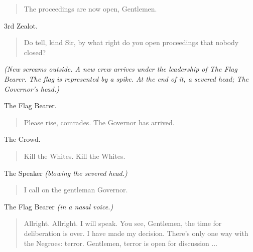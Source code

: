 \documentclass[letterpaper,article,12pt,oneside,notitlepage]{memoir}
\begin{document}
\begin{verse}
\hspace{1cm} The proceedings are now open, Gentlemen. \\
\end{verse}

\begin{center}3rd Zealot.\end{center}

\begin{verse}
\indent Do tell, kind Sir, by what right do you open proceedings that nobody closed? \\
\end{verse}

\textit{(New screams outside. A new crew arrives under the leadership of The Flag Bearer. The flag is represented by a spike. At the end of it, a severed head; The Governor's head.)}

\begin{center}The Flag Bearer.\end{center}

\begin{verse}
\hspace{1cm} Please rise, comrades. The Governor has arrived. \\
\end{verse}

\begin{center}The Crowd.\end{center}

\begin{verse}
\hspace{1cm} Kill the Whites. Kill the Whites. \\
\end{verse}

\begin{center}The Speaker \textit{(blowing the severed head.)}\end{center}

\begin{verse}
\hspace{1cm} I call on the gentleman Governor. \\
\end{verse}

\begin{center}The Flag Bearer \textit{(in a nasal voice.)}\end{center}

\begin{verse}
\indent Allright. Allright. I will speak. You see, Gentlemen, the time for deliberation is over. I have made my decision. There's only one way with the Negroes: terror. Gentlemen, terror is open for discussion ... \\
\end{verse}
\end{document}
